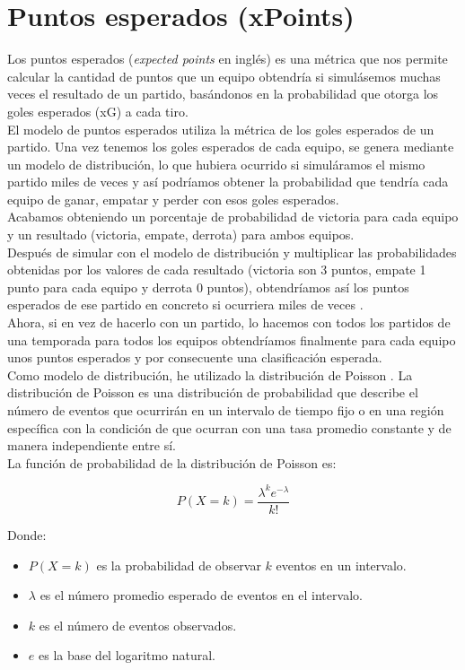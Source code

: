 \section{Puntos esperados (xPoints)}
Los puntos esperados (\textit{expected points} en inglés) es una métrica que nos permite calcular la cantidad de puntos que un equipo obtendría si simulásemos muchas veces el resultado de un partido, basándonos en la probabilidad que otorga los goles esperados (xG) a cada tiro. \\
El modelo de puntos esperados utiliza la métrica de los goles esperados de un partido. Una vez tenemos los goles esperados de cada equipo, se genera mediante un modelo de distribución, lo que hubiera ocurrido si simuláramos el mismo partido miles de veces y así podríamos obtener la probabilidad que tendría cada equipo de ganar, empatar y perder con esos goles esperados. \\
Acabamos obteniendo un porcentaje de probabilidad de victoria para cada equipo y un resultado (victoria, empate, derrota) para ambos equipos. \\
Después de simular con el modelo de distribución y multiplicar las probabilidades obtenidas por los valores de cada resultado (victoria son 3 puntos, empate 1 punto para cada equipo y derrota 0 puntos), obtendríamos así los puntos esperados de ese partido en concreto si ocurriera miles de veces \cite{puntosEsperados:latex}. \\
Ahora, si en vez de hacerlo con un partido, lo hacemos con todos los partidos de una temporada para todos los equipos obtendríamos finalmente para cada equipo unos puntos esperados y por consecuente una clasificación esperada. \\

Como modelo de distribución, he utilizado la distribución de Poisson \cite{poisson:latex}. La distribución de Poisson es una distribución de probabilidad que describe el número de eventos que ocurrirán en un intervalo de tiempo fijo o en una región específica con la condición de que ocurran con una tasa promedio constante y de manera independiente entre sí. \\
La función de probabilidad de la distribución de Poisson es:

\[ P(X = k) = \frac{\lambda^k e^{-\lambda}}{k!} \]

Donde:
\begin{itemize}
  \item \( P(X = k) \) es la probabilidad de observar \( k \) eventos en un intervalo.
  \item \( \lambda \) es el número promedio esperado de eventos en el intervalo.
  \item \( k \) es el número de eventos observados.
  \item \( e \) es la base del logaritmo natural.
\end{itemize}


